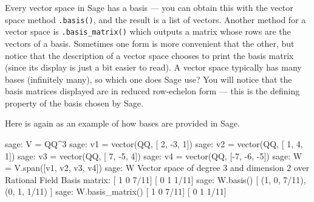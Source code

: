 Every vector space in Sage has a basis --- you can obtain this with the vector space method \verb?.basis()?, and the result is a list of vectors.  Another method for a vector space is \verb?.basis_matrix()? which outputs a matrix whose rows are the vectors of a basis.  Sometimes one form is more convenient that the other, but notice that the description of a vector space chooses to print the basis matrix (since its display is just a bit easier to read).  A vector space typically has many bases (infinitely many), so which one does Sage use?  You will notice that the basis matrices displayed are in reduced row-echelon form --- this is the defining property of the basis chosen by Sage.\par
%
Here is  again as an example of how bases are provided in Sage.
%
\begin{sageexample}
sage: V = QQ^3
sage: v1 = vector(QQ, [ 2, -3,  1])
sage: v2 = vector(QQ, [ 1,  4,  1])
sage: v3 = vector(QQ, [ 7, -5,  4])
sage: v4 = vector(QQ, [-7, -6, -5])
sage: W = V.span([v1, v2, v3, v4])
sage: W
Vector space of degree 3 and dimension 2 over Rational Field
Basis matrix:
[   1    0 7/11]
[   0    1 1/11]
sage: W.basis()
[
(1, 0, 7/11),
(0, 1, 1/11)
]
sage: W.basis_matrix()
[   1    0 7/11]
[   0    1 1/11]
\end{sageexample}
%
%
\begin{sageverbatim}
\end{sageverbatim}
%
